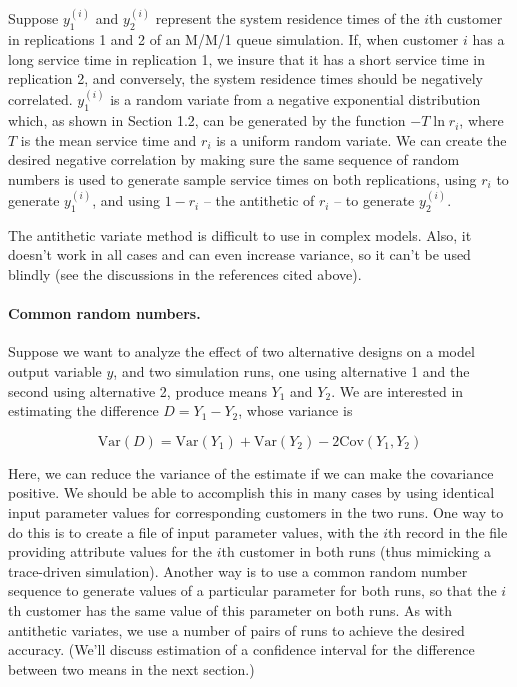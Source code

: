 Suppose $y_1^{(i)}$ and $y_2^{(i)}$ represent the system residence times of the
$i$th customer in replications 1 and 2 of an M/M/1 queue simulation. If, when
customer $i$ has a long service time in replication 1, we insure that it has a
short service time in replication 2, and conversely, the system residence times
should be negatively correlated. $y_1^{(i)}$ is a random variate from a
\noindent negative exponential distribution which, as shown in Section 1.2, can be generated by
the function $-T \ln r_i$, where $T$ is the mean service time and $r_i$ is a
uniform random variate. We can create the desired negative correlation by
making sure the same sequence of random numbers is used to generate sample
service times on both replications, using $r_i$ to generate $y_1^{(i)}$, and
using $1-r_i$ -- the antithetic of $r_i$ -- to generate $y_2^{(i)}$.

The antithetic variate method is difficult to use in complex models. Also, it
doesn't work in all cases and can even increase variance, so it can't be used
blindly (see the discussions in the references cited above).

\paragraph{Common random numbers.}
Suppose we want to analyze the effect of two alternative designs on a model
output variable $y$, and two simulation runs, one using alternative 1 and the
second using alternative 2, produce means $Y_1$ and $Y_2$. We are interested in
estimating the difference $D = Y_1 - Y_2$, whose variance is

\begin{equation}
\mathrm{Var}(D) = \mathrm{Var}(Y_1) + \mathrm{Var}(Y_2) - 2\mathrm{Cov}(Y_1,Y_2)
\label{eq:output-common-rn}
\end{equation}

Here, we can reduce the variance of the estimate if we can make the covariance
positive. We should be able to accomplish this in many cases by using identical
input parameter values for corresponding customers in the two runs. One way to
do this is to create a file of input parameter values, with the $i$th record in
the file providing attribute values for the $i$th customer in both runs (thus
mimicking a trace-driven simulation). Another way is to use a common random
number sequence to generate values of a particular parameter for both runs, so
that the $i$th customer has the same value of this parameter on both runs. As
with antithetic variates, we use a number of pairs of runs to achieve the
desired accuracy. (We'll discuss estimation of a confidence interval for the
difference between two means in the next section.)

